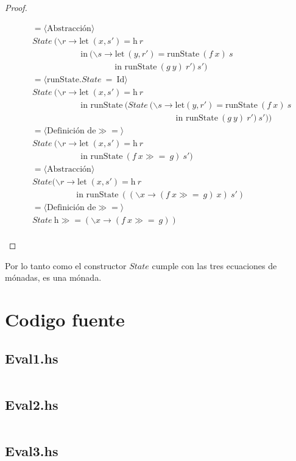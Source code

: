\documentclass[a4paper,12pt]{article}
\begin{document}
\begin{proof}
\begin{fleqn}
\begin{equation*} 
\begin{split}
  & =\langle \mbox{Abstracción}  \rangle \\
  & State \ (\backslash r \to \mbox{let} \; (x,s') = \mbox{h} \ r \\
  & \hspace{68pt} \mbox{in} \ (\backslash s \to \mbox{let} \ (y,r') = \mbox{runState} \ (f \ x) \ s\\
  & \hspace{116pt} \mbox{in  runState} \ (g \ y) \ r' ) \ s')\\
  & =\langle \mbox{runState.} State \ = \ \mbox{Id}  \rangle \\
  & State \ (\backslash r \to \mbox{let} \; (x,s') = \mbox{h} \ r \\
  & \hspace{68pt} \mbox{in runState} \ (State \ (\backslash s \to \mbox{let} (y,r') = \mbox{runState} \ (f \ x) \ s\\
  & \hspace{202pt} \mbox{in  runState} \ (g \ y) \ r' ) \ s'))\\
  & =\langle \mbox{Definición de}\gg= \rangle \\
  & State \ (\backslash r \to \mbox{let} \; (x,s') = \mbox{h} \ r \\
  & \hspace{68pt} \mbox{in runState} \ (f \ x \gg= \ g) \ s')\\
  & =\langle \mbox{Abstracción}  \rangle \\
  & State (\backslash r \to \mbox{let} \; (x,s') = \mbox{h} \ r \\
  & \hspace{62pt} \mbox{in runState} \ ((\backslash x \to (f \ x \gg= \ g) \ x)\ s')\\
  & =\langle \mbox{Definición de}\gg= \rangle \\
  & State \ \mbox{h} \gg= (\backslash x \to (f \ x \gg= \ g))\\
\end{split}
\end{equation*}
\end{fleqn}
\end{proof}


Por lo tanto como el constructor $State$ cumple con las tres ecuaciones de mónadas, es una mónada.


\newpage
\section*{Codigo fuente}

\subsection*{Eval1.hs}
\inputminted[fontsize=\footnotesize]{haskell}{Eval1.hs}
\subsection*{Eval2.hs}
\inputminted[fontsize=\footnotesize]{haskell}{Eval2.hs}
\subsection*{Eval3.hs}
\inputminted[fontsize=\footnotesize]{haskell}{Eval3.hs}
\end{document}
